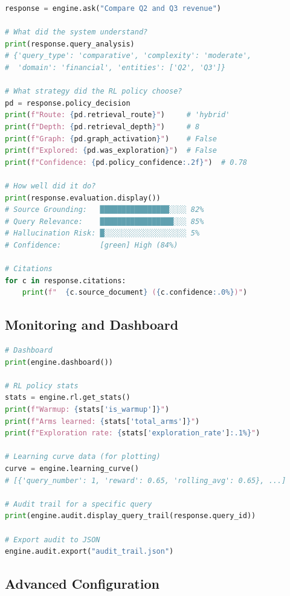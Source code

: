 \documentclass[11pt]{article}
\begin{document}
\begin{lstlisting}[language=Python, caption={Accessing response internals.}]
response = engine.ask("Compare Q2 and Q3 revenue")

# What did the system understand?
print(response.query_analysis)
# {'query_type': 'comparative', 'complexity': 'moderate',
#  'domain': 'financial', 'entities': ['Q2', 'Q3']}

# What strategy did the RL policy choose?
pd = response.policy_decision
print(f"Route: {pd.retrieval_route}")     # 'hybrid'
print(f"Depth: {pd.retrieval_depth}")     # 8
print(f"Graph: {pd.graph_activation}")    # False
print(f"Explored: {pd.was_exploration}")  # False
print(f"Confidence: {pd.policy_confidence:.2f}")  # 0.78

# How well did it do?
print(response.evaluation.display())
# Source Grounding:   ████████████████░░░░ 82%
# Query Relevance:    █████████████████░░░ 85%
# Hallucination Risk: █░░░░░░░░░░░░░░░░░░░ 5%
# Confidence:         [green] High (84%)

# Citations
for c in response.citations:
    print(f"  {c.source_document} ({c.confidence:.0%})")
\end{lstlisting}

\subsection{Monitoring and Dashboard}

\begin{lstlisting}[language=Python, caption={System monitoring.}]
# Dashboard
print(engine.dashboard())

# RL policy stats
stats = engine.rl.get_stats()
print(f"Warmup: {stats['is_warmup']}")
print(f"Arms learned: {stats['total_arms']}")
print(f"Exploration rate: {stats['exploration_rate']:.1%}")

# Learning curve data (for plotting)
curve = engine.learning_curve()
# [{'query_number': 1, 'reward': 0.65, 'rolling_avg': 0.65}, ...]

# Audit trail for a specific query
print(engine.audit.display_query_trail(response.query_id))

# Export audit to JSON
engine.audit.export("audit_trail.json")
\end{lstlisting}

\subsection{Advanced Configuration}
\end{document}
